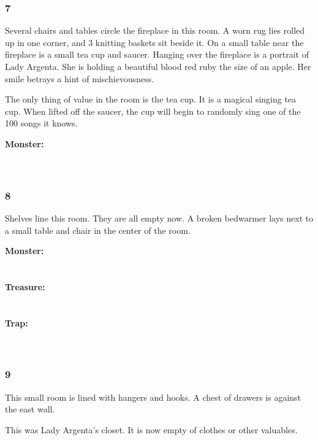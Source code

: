 \documentclass[palace_of_the_silver_princess]{subfiles}
\begin{document}
\subsubsection{7}
\begin{quotebox}
    Several chairs and tables circle the fireplace in this room. A worn rug
    lies rolled up in one corner, and 3 knitting baskets sit beside it. On a
    small table near the fireplace is a small tea cup and saucer. Hanging
    over the fireplace is a portrait of Lady Argenta. She is holding a
    beautiful blood red ruby the size of an apple. Her smile betrays a hint
    of mischievousness.
\end{quotebox}

The only thing of value in the room is the tea cup. It is a magical
singing tea cup. When lifted off the saucer, the cup will begin to
randomly sing one of the 100 songs it knows.

\textbf{Monster:}
\\
\\
\\

\subsubsection{8}
\begin{quotebox}
    Shelves line this room. They are all empty now. A broken bedwarmer
    lays next to a small table and chair in the center of the room.
\end{quotebox}

\textbf{Monster:}
\\
\\
\\
\textbf{Treasure:}
\\
\\
\\
\textbf{Trap:}
\\
\\
\\

\subsubsection{9}
\begin{quotebox}
    This small room is lined with hangers and hooks. A chest of drawers
    is against the east wall.
\end{quotebox}

This was Lady Argenta’s closet. It is now empty of clothes or other
valuables.
\end{document}
